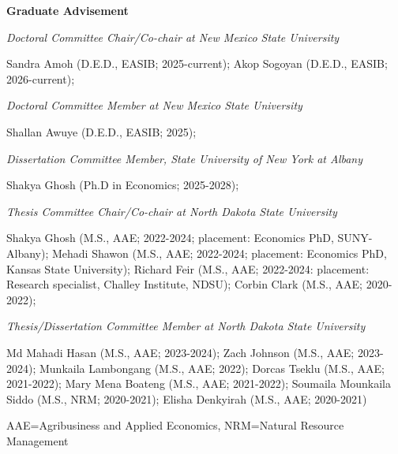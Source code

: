 \documentclass[12pt,letterpaper]{report}
\newcommand{\listitemspace}{0.15em} %
\renewenvironment{itemize}
{\begin{list}{}{\setlength{\leftmargin}{0em}
            \setlength{\parskip}{0em}
            \setlength{\itemsep}{\listitemspace}
            \setlength{\parsep}{\listitemspace}}}
{\end{list}}
\begin{document}
\begin{itemize}
\item [] \textbf{Graduate Advisement}

\item [] \textit{Doctoral Committee Chair/Co-chair at New Mexico State University}
\item Sandra Amoh (D.E.D., EASIB; 2025-current);
Akop Sogoyan (D.E.D., EASIB; 2026-current);

\item [] \textit{Doctoral Committee Member at New Mexico State University}
\item Shallan Awuye  (D.E.D., EASIB; 2025);

\item [] \textit{Dissertation Committee Member, State University of New York at Albany}
\item Shakya Ghosh  (Ph.D in Economics; 2025-2028);

\item [] \textit{Thesis Committee Chair/Co-chair at North Dakota State University}
\item Shakya Ghosh  (M.S., AAE; 2022-2024; placement: Economics PhD, SUNY-Albany);
Mehadi Shawon  (M.S., AAE; 2022-2024; placement: Economics PhD, Kansas State University);
Richard Feir (M.S., AAE; 2022-2024: placement: Research specialist, Challey Institute, NDSU);
Corbin Clark (M.S., AAE; 2020-2022);

\item [] \textit{Thesis/Dissertation Committee Member at North Dakota State University}
\item [] Md Mahadi Hasan (M.S., AAE; 2023-2024);
Zach Johnson (M.S., AAE; 2023-2024);
Munkaila Lambongang (M.S., AAE; 2022);
Dorcas Tseklu (M.S., AAE; 2021-2022);
Mary Mena Boateng  (M.S., AAE; 2021-2022);
 Soumaila Mounkaila Siddo (M.S., NRM; 2020-2021);
 Elisha Denkyirah (M.S., AAE; 2020-2021)
\item [] {\small AAE=Agribusiness and Applied Economics, NRM=Natural Resource Management}
\end{itemize}



\end{document}
